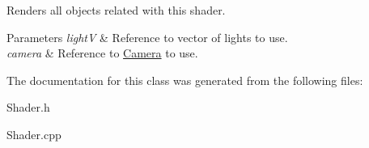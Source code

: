 Renders all objects related with this shader.


\begin{DoxyParams}{Parameters}
{\em lightV} & Reference to vector of lights to use. \\
\hline
{\em camera} & Reference to \hyperlink{class_camera}{Camera} to use. \\
\hline
\end{DoxyParams}


The documentation for this class was generated from the following files\+:\begin{DoxyCompactItemize}
\item 
Shader.\+h\item 
Shader.\+cpp\end{DoxyCompactItemize}
